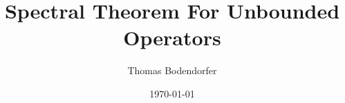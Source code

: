 \documentclass[a4paper,10pt, draft]{article}
\author{Thomas Bodendorfer}
\date{\today}
\title{Spectral Theorem For Unbounded Operators}
\begin{document}
 


\maketitle
\tableofcontents







\nocite{*}

 
\end{document}

